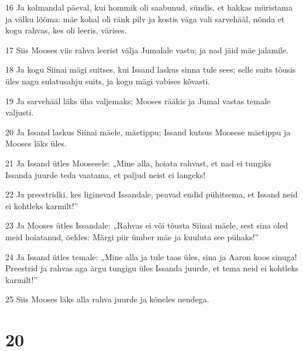 \par 16 Ja kolmandal päeval, kui hommik oli saabunud, sündis, et hakkas müristama ja välku lööma: mäe kohal oli ränk pilv ja kostis väga vali sarvehääl, nõnda et kogu rahvas, kes oli leeris, värises.
\par 17 Siis Mooses viis rahva leerist välja Jumalale vastu; ja nad jäid mäe jalamile.
\par 18 Ja kogu Siinai mägi suitses, kui Issand laskus sinna tule sees; selle suits tõusis üles nagu sulatusahju suits, ja kogu mägi vabises kõvasti.
\par 19 Ja sarvehääl läks üha valjemaks; Mooses rääkis ja Jumal vastas temale valjusti.
\par 20 Ja Issand laskus Siinai mäele, mäetippu; Issand kutsus Moosese mäetippu ja Mooses läks üles.
\par 21 Ja Issand ütles Moosesele: „Mine alla, hoiata rahvast, et nad ei tungiks Issanda juurde teda vaatama, et paljud neist ei langeks!
\par 22 Ja preestridki, kes liginevad Issandale, peavad endid pühitsema, et Issand neid ei kohtleks karmilt!”
\par 23 Ja Mooses ütles Issandale: „Rahvas ei või tõusta Siinai mäele, sest sina oled meid hoiatanud, öeldes: Märgi piir ümber mäe ja kuuluta see pühaks!”
\par 24 Ja Issand ütles temale: „Mine alla ja tule taas üles, sina ja Aaron koos sinuga! Preestrid ja rahvas aga ärgu tungigu üles Issanda juurde, et tema neid ei kohtleks karmilt!”
\par 25 Siis Mooses läks alla rahva juurde ja kõneles nendega.

\chapter{20}

